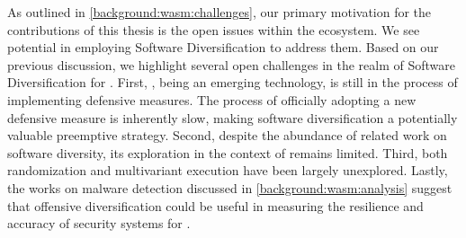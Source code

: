 \label{sota:openchallenges}
As outlined in \autoref{background:wasm:challenges}, our primary motivation for the contributions of this thesis is the open issues within the \Wasm ecosystem. 
We see potential in employing Software Diversification to address them. 
Based on our previous discussion, we highlight several open challenges in the realm of Software Diversification for \Wasm. 
First, \Wasm, being an emerging technology, is still in the process of implementing defensive measures. 
The process of officially adopting a new defensive measure is inherently slow, making software diversification a potentially valuable preemptive strategy. 
Second, despite the abundance of related work on software diversity, its exploration in the context of \Wasm remains limited. 
Third, both randomization and multivariant execution have been largely unexplored. 
Lastly, the works on malware detection discussed in \autoref{background:wasm:analysis} suggest that offensive diversification could be useful in measuring the resilience and accuracy of security systems for \Wasm.






